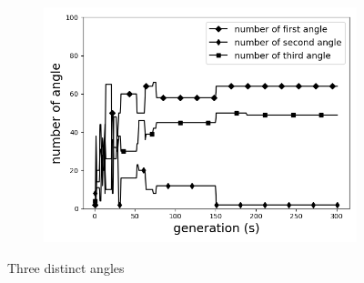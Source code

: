 \documentclass{article}
\begin{document}
\begin{figure}[!t]
		\begin{subfigure}[b]{0.8\linewidth}
			\includegraphics[width=\linewidth]{2020-11-10-pre-image/three_distinct_angle_number_of_angle.png}
		\end{subfigure}
	\caption{Three distinct angles}
	\label{fig:three_angles}
\end{figure}
\end{document}
